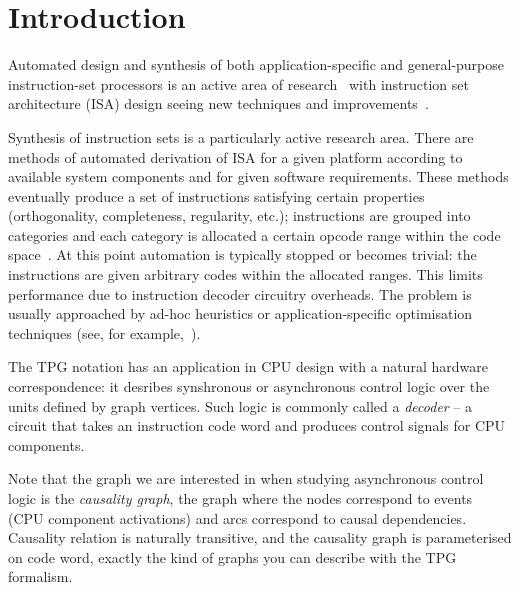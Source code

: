 \section{Introduction\label{sec:PGEncoding-intro}}

Automated design and synthesis of both application-specific and general-purpose
instruction-set processors is an active area of research~\cite{2006_dutt_chapter}
with instruction set architecture (ISA) design seeing new techniques and improvements~\cite{2002_qin_date}.


Synthesis of instruction sets is a particularly active research area.
There are methods of automated derivation of ISA for a given platform
according to available system components
and for given software requirements. These methods eventually produce a
set of instructions satisfying certain properties (orthogonality,
completeness, regularity, etc.); instructions are grouped into categories
and each category is allocated a certain opcode range within the
code space~\cite{2003_nohl_dac}. At this point automation is typically
stopped or becomes trivial: the instructions are given arbitrary codes
within the allocated ranges. This limits performance due to instruction
decoder circuitry overheads. The problem is usually approached by
ad-hoc heuristics or application-specific optimisation techniques
(see, for example,~\cite{2002_lee_iccad}).

The TPG notation has an application in CPU design with a natural hardware correspondence: it desribes synshronous or asynchronous control logic over the units defined by graph vertices. Such logic is commonly called a \emph{decoder} -- a circuit that takes an instruction code word and produces control signals for CPU components.

Note that the graph we are interested in when studying asynchronous control logic is the \emph{causality graph}, the graph where the nodes correspond to events (CPU component activations) and arcs correspond to causal dependencies. Causality relation is naturally transitive, and the causality graph is parameterised on code word, exactly the kind of graphs you can describe with the TPG formalism.

